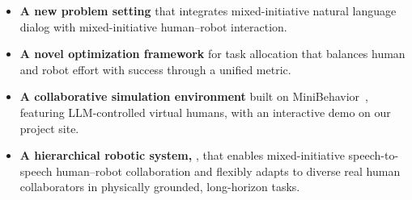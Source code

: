 \begin{itemize}

\item \textbf{A new problem setting} that integrates mixed-initiative natural language dialog with mixed-initiative human–robot interaction.

\item \textbf{A novel optimization framework} for task allocation that balances human and robot effort with success through a unified metric.

\item \textbf{A collaborative simulation environment} built on MiniBehavior~\cite{jin2023minibehavior}, featuring LLM-controlled virtual humans, with an interactive demo on our project site.\footnotemark[1]

\item \textbf{A hierarchical robotic system, \ours{}}, that enables mixed-initiative speech-to-speech human–robot collaboration and flexibly adapts to diverse real human collaborators in physically grounded, long-horizon tasks.

\end{itemize}

